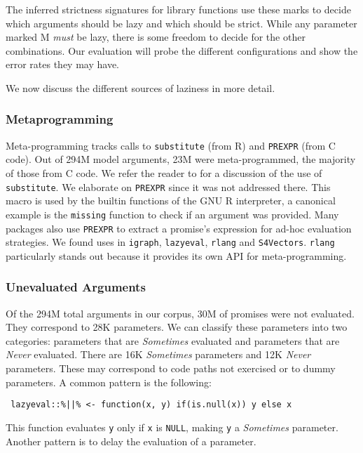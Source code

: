 \documentclass[review,nonacm,screen,acmsmall,anonymous=true]{acmart}
\newcommand{\sometimes}{\emph{Sometimes}\xspace}
\newcommand{\never}{\emph{Never}\xspace}
\newcommand{\code}[1]{\lstinline |#1|\xspace}
\begin{document}
The inferred strictness signatures for library functions use these marks to
decide which arguments should be lazy and which should be strict. While any
parameter marked M \emph{must} be lazy, there is some freedom to decide for the
other combinations. Our evaluation will probe the different configurations and
show the error rates they may have.

\medskip

We now discuss the different sources of laziness in more detail.

\subsubsection{Metaprogramming}

Meta-programming tracks calls to \code{substitute} (from R) and \code{PREXPR}
(from C code). Out of 294M model arguments, 23M were meta-programmed, the
majority of those from C code. We refer the reader to \citet{oopsla19b} for a
discussion of the use of \code{substitute}. We elaborate on \code{PREXPR} since
it was not addressed there. This macro is used by the builtin functions of the
GNU R interpreter, a canonical example is the \code{missing} function to check
if an argument was provided. Many packages also use \code{PREXPR} to extract a
promise's expression for ad-hoc evaluation strategies. We found uses in
\code{igraph}, \code{lazyeval}, \code{rlang} and \code{S4Vectors}. \code{rlang}
particularly stands out because it provides its own API for meta-programming.

\subsubsection{Unevaluated Arguments}

Of the 294M total arguments in our corpus, 30M of promises were not evaluated. They
correspond to 28K parameters. We can classify these parameters into two
categories: parameters that are \sometimes evaluated and parameters that are
\never evaluated. There are 16K \sometimes parameters and 12K \never parameters.
These may correspond to code paths not exercised or to dummy parameters.
%
A common pattern is the following:
%
\begin{lstlisting}
 lazyeval::%||% <- function(x, y) if(is.null(x)) y else x
\end{lstlisting}
%
This function evaluates \code{y} only if \code{x} is \code{NULL}, making
\code{y} a \sometimes parameter.
\noindent
Another pattern is to delay the evaluation of a parameter.
\end{document}

